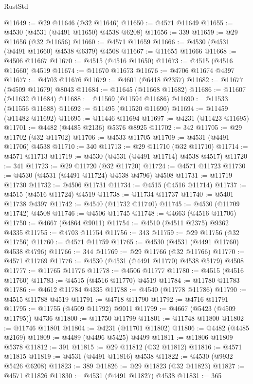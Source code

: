 \begin{lexlean}{RustStd}
\begin{coremodule}
@11649 := @29 @11646 (@32 @11646)
@11650 := @4571 @11649
@11655 := @4530 (@4531 (@4491 @11650) @4538 @6208)
@11656 := 339
@11659 := @29 @11656 (@32 @11656)
@11660 := @4571 @11659
@11666 := @4530 (@4531 (@4491 @11660) @4538 @6379) @4508
@11667 := @11655 @11666
@11668 := @4506 @11667
@11670 := @4515 (@4516 @11650)
@11673 := @4515 (@4516 @11660) @4519
@11674 := @11670 @11673
@11676 := @4706 @11674 @4397
@11677 := @4703 @11676
@11679 := @4601 (@6418 @2357)
@11682 := @11677 (@4509 @11679) @8043
@11684 := @11645 (@11668 @11682)
@11686 := @11607 (@11632 @11684)
@11688 := @11569 (@11594 @11686)
@11690 := @11533 (@11556 @11688)
@11692 := @11495 (@11520 @11690)
@11694 := @11459 (@11482 @11692)
@11695 := @11446 @11694
@11697 := @4231 (@11423 @11695)
@11701 := @4482 (@4485 @2136) @5376 @8925
@11702 := 342
@11705 := @29 @11702 (@32 @11702)
@11706 := @4533 @11705
@11709 := @4531 (@4491 @11706) @4538
@11710 := 340
@11713 := @29 @11710 (@32 @11710)
@11714 := @4571 @11713
@11719 := @4530 (@4531 (@4491 @11714) @4538 @4517)
@11720 := 341
@11723 := @29 @11720 (@32 @11720)
@11724 := @4571 @11723
@11730 := @4530 (@4531 (@4491 @11724) @4538 @4796) @4508
@11731 := @11719 @11730
@11732 := @4506 @11731
@11734 := @4515 (@4516 @11714)
@11737 := @4515 (@4516 @11724) @4519
@11738 := @11734 @11737
@11740 := @5401 @11738 @4397
@11742 := @4540 (@11732 @11740)
@11745 := @4530 (@11709 @11742) @4508
@11746 := @4506 @11745
@11748 := @4663 (@4516 @11706)
@11750 := @4667 (@4864 @9011)
@11754 := @4510 (@4511 @2375) @9362 @4335
@11755 := @4703 @11754
@11756 := 343
@11759 := @29 @11756 (@32 @11756)
@11760 := @4571 @11759
@11765 := @4530 (@4531 (@4491 @11760) @4538 @4796)
@11766 := 344
@11769 := @29 @11766 (@32 @11766)
@11770 := @4571 @11769
@11776 := @4530 (@4531 (@4491 @11770) @4538 @5179) @4508
@11777 := @11765 @11776
@11778 := @4506 @11777
@11780 := @4515 (@4516 @11760)
@11783 := @4515 (@4516 @11770) @4519
@11784 := @11780 @11783
@11786 := @4612 @11784 @4335
@11788 := @4540 (@11778 @11786)
@11790 := @4515 @11788 @4519
@11791 := @4718 @11790
@11792 := @4716 @11791
@11795 := @11755 (@4509 @11792) @9011
@11799 := @4667 (@5423 (@4509 @11795)) @4736
@11800 := @11750 @11799
@11801 := @11748 @11800
@11802 := @11746 @11801
@11804 := @4231 (@11701 @11802)
@11806 := @4482 (@4485 @2169)
@11809 := @4489 (@4496 @5425) @4499
@11811 := @11806 @11809 @5378
@11812 := 391
@11815 := @29 @11812 (@32 @11812)
@11816 := @4571 @11815
@11819 := @4531 (@4491 @11816) @4538
@11822 := @4530 (@9932 @5426 @6208)
@11823 := 389
@11826 := @29 @11823 (@32 @11823)
@11827 := @4571 @11826
@11830 := @4531 (@4491 @11827) @4538
@11831 := 365

\end{coremodule}
\end{lexlean}
